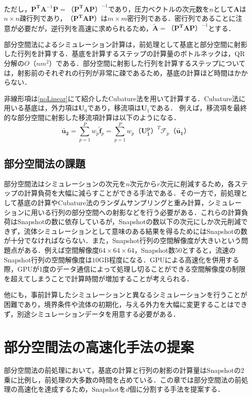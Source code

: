 \documentclass[a4j,12pt]{jreport}
\begin{document}
ただし，$\mathbf{P^T}\mathbf{A}^{-1}\mathbf{P} = （\mathbf{P^T}\mathbf{A}\mathbf{P}）^{-1}$であり，圧力ベクトルの次元数を$n$として$\mathbf{A}$は$n\times n$疎行列であり，$（\mathbf{P^T}\mathbf{A}\mathbf{P}）$は$m\times m$密行列である．密行列であることに注意が必要だが，逆行列を高速に求められるため，$\mathbf{\tilde{A}} = （\mathbf{P^T}\mathbf{A}\mathbf{P}）^{-1}$とする．

部分空間法によるシミュレーション計算は，前処理として基底と部分空間に射影した行列を計算する．基底を計算するステップの計算量のボトルネックは，QR分解の$O（nm^2）$である．部分空間に射影した行列を計算するステップについては，射影前のそれぞれの行列が非常に疎であるため，基底の計算ほど時間はかからない．

非線形項は\ref{noLinear}にて紹介したCubature法を用いて計算する．Cubature法に用いる基底は，外力項は$\mathbf{U}_0$であり，移流項は$\mathbf{U}_1$である．
例えば，移流項を最終的な部分空間に射影した移流項計算は以下のようになる．
\[
	\bm{\tilde{u_2}} = \sum_{p=1}^Pw_p\bm{\tilde{f}}_p =   \sum_{p=1}^Pw_p（\mathbf{U^p_1}）^T\mathcal{F}_p（\bm{\tilde{u_1}}）
\]

\section{部分空間法の課題}
部分空間法はシミュレーションの次元を$n$次元から$r$次元に削減するため，各ステップの計算負荷を大幅に減らすことができる手法である．その一方で，前処理として基底の計算やCubature法のランダムサンプリングと重み計算，シミュレーションに用いる行列の部分空間への射影などを行う必要がある．これらの計算負荷はSnapshotの数に依存しているが，Snapshotの数以下の次元にしか次元削減できず，流体シミュレーションとして意味のある結果を得るためにはSnapshotの数が十分でなければならない．また，Snapshot行列の空間解像度が大きいという問題点がある．例えば空間解像度$64\times64\times64$，Snapshot数$50$とすると，流速のSnapshot行列の空間解像度は$10$GB程度になる．GPUによる高速化を併用する際，GPUが1度のデータ通信によって処理し切ることができる空間解像度の制限を超えてしまうことで計算時間が増加することが考えられる．

他にも，事前計算したシミュレーションと異なるシミュレーションを行うことが困難であり，境界条件や流体の初期化，与える外力を大幅に変更することはできず，別途シミュレーションデータを用意する必要がある．

\chapter{部分空間法の高速化手法の提案} \label{chapter:3}
部分空間法の前処理において，基底の計算と行列の射影の計算量はSnapshotの2乗に比例し，前処理の大多数の時間を占めている．この章では部分空間法の前処理の高速化を達成するため，Snapshotを$d$個に分割する手法を提案する．
\end{document}
